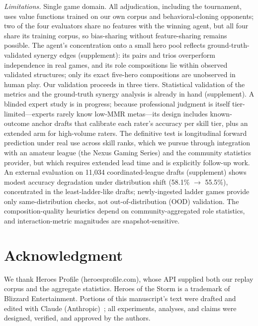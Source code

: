 \documentclass[journal]{IEEEtran}
\newif\ifanonymous
\begin{document}
\textit{Limitations.} Single game domain. All adjudication, including the tournament, uses value functions trained on our own corpus and behavioral-cloning opponents; two of the four evaluators share no features with the winning agent, but all four share its training corpus, so bias-sharing without feature-sharing remains possible. The agent's concentration onto a small hero pool reflects ground-truth-validated synergy edges (supplement): its pairs and trios overperform independence in real games, and its role compositions lie within observed validated structures; only its exact five-hero compositions are unobserved in human play. Our validation proceeds in three tiers. Statistical validation of the metrics and the ground-truth synergy analysis is already in hand (supplement). A blinded expert study is in progress; because professional judgment is itself tier-limited---experts rarely know low-MMR metas---its design includes known-outcome anchor drafts that calibrate each rater's accuracy per skill tier, plus an extended arm for high-volume raters. The definitive test is longitudinal forward prediction under real use across skill ranks, which we pursue through integration with an amateur league (the Nexus Gaming Series) and the community statistics provider, but which requires extended lead time and is explicitly follow-up work. An external evaluation on 11{,}034 coordinated-league drafts (supplement) shows modest accuracy degradation under distribution shift (58.1\% $\to$ 55.5\%), concentrated in the least-ladder-like drafts; newly-ingested ladder games provide only same-distribution checks, not out-of-distribution (OOD) validation. The composition-quality heuristics depend on community-aggregated role statistics, and interaction-metric magnitudes are snapshot-sensitive.

\ifanonymous
\section*{AI Disclosure}

Portions of this manuscript's text were drafted and edited with Claude (Anthropic)~\cite{claude}; all experiments, analyses, and claims were designed, verified, and approved by the authors.
\else
\section*{Acknowledgment}

We thank Heroes Profile (heroesprofile.com), whose API supplied both our replay corpus and the aggregate statistics. Heroes of the Storm is a trademark of Blizzard Entertainment. Portions of this manuscript's text were drafted and edited with Claude (Anthropic)~\cite{claude}; all experiments, analyses, and claims were designed, verified, and approved by the authors.
\fi
\end{document}
